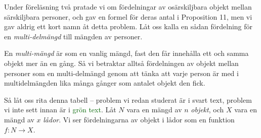 \documentclass[nobib]{tufte-handout}
\begin{document}
Under föreläsning två pratade vi om fördelningar av osärskiljbara objekt mellan särskiljbara personer, och gav en formel för deras antal i Proposition 11, men vi gav aldrig ett kort namn åt detta problem. Låt oss kalla en sådan fördelning för en \emph{multi-delmängd} till mängden av personer.

En \emph{multi-mängd} är som en vanlig mängd, fast den får innehålla ett och samma objekt mer än en gång. Så vi betraktar alltså fördelningen av objekt mellan personer som en multi-delmängd genom att tänka att varje person är med i multidelmängden lika många gånger som antalet objekt den fick.

Så låt oss rita denna tabell -- problem vi redan studerat är i svart text, problem vi inte sett innan är i \textcolor{darkgreen}{grön text}. Låt $N$ vara en mängd av $n$ \emph{objekt}, och $X$ vara en mängd av $x$ \emph{lådor}. Vi ser fördelningarna av objekt i lådor som en funktion $f: N \to X$.

\hfill \break
\end{document}
